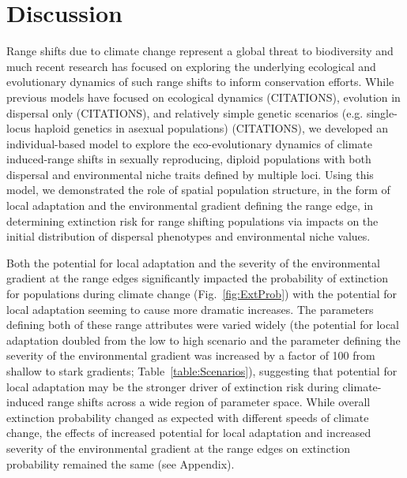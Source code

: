 \documentclass[11pt, oneside]{article}
\begin{document}
\section{Discussion}
Range shifts due to climate change represent a global threat to biodiversity and much recent research has focused on exploring the underlying ecological and evolutionary dynamics of such range shifts to inform conservation efforts. While previous models have focused on ecological dynamics (CITATIONS), evolution in dispersal only (CITATIONS), and relatively simple genetic scenarios (e.g. single-locus haploid genetics in asexual populations) (CITATIONS), we developed an individual-based model to explore the eco-evolutionary dynamics of climate induced-range shifts in sexually reproducing, diploid populations with both dispersal and environmental niche traits defined by multiple loci. Using this model, we demonstrated the role of spatial population structure, in the form of local adaptation and the environmental gradient defining the range edge, in determining extinction risk for range shifting populations via impacts on the initial distribution of dispersal phenotypes and environmental niche values.

Both the potential for local adaptation and the severity of the environmental gradient at the range edges significantly impacted the probability of extinction for populations during climate change (Fig.~\ref{fig:ExtProb}) with the potential for local adaptation seeming to cause more dramatic increases. The parameters defining both of these range attributes were varied widely (the potential for local adaptation doubled from the low to high scenario and the parameter defining the severity of the environmental gradient was increased by a factor of 100 from shallow to stark gradients; Table~\ref{table:Scenarios}), suggesting that potential for local adaptation may be the stronger driver of extinction risk during climate-induced range shifts across a wide region of parameter space. While overall extinction probability changed as expected with different speeds of climate change, the effects of increased potential for local adaptation and increased severity of the environmental gradient at the range edges on extinction probability remained the same (see Appendix).
\end{document}
